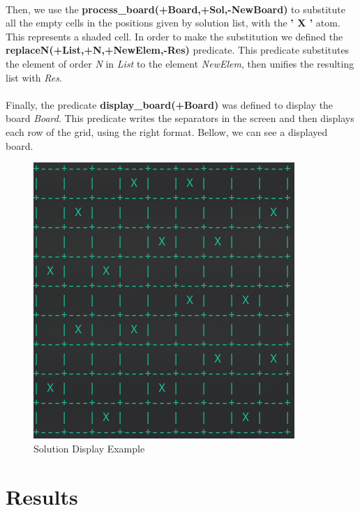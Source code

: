\documentclass[runningheads]{llncs}
\begin{document}
\paragraph{}
Then, we use the \textbf{process\_board(+Board,+Sol,-NewBoard)} to substitute all the empty cells in the positions given
by solution list, with the \textbf{' X '} atom.
This represents a shaded cell. In order to make the substitution we defined
the \textbf{replaceN(+List,+N,+NewElem,-Res)} predicate. This predicate substitutes the element of order \textit{N} in
\textit{List} to the element \textit{NewElem}, then unifies the resulting list with \textit{Res}.

\paragraph{}
Finally, the predicate \textbf{display\_board(+Board)} was defined to display the board \textit{Board}. This predicate
writes the separators in the screen and then displays each row of the grid, using the right format. Bellow, we can see a
displayed board.

\begin{figure}
    \begin{center}
        \includegraphics[scale=0.5]{images/fig2.png}
        \caption{Solution Display Example} \label{fig2}
    \end{center}
\end{figure}

\newpage

\section{Results}
\end{document}
